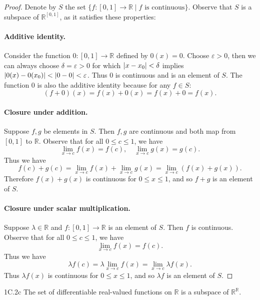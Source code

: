 \documentclass{exam}
\begin{document}
\begin{proof}
    Denote by $S$ the set $\{f: [0, 1]\to\mathbb R\mid f\text{ is continuous}\}$. Observe that $S$ is a subspace of $\mathbb R^{[0, 1]}$, as it satisfies these properties:
    \paragraph{Additive identity.} Consider the function $0:[0, 1]\to\mathbb R$ defined by $0(x) = 0$. Choose $\varepsilon > 0$, then we can always choose $\delta = \varepsilon >  0$ for which $\abs{x-x_0} < \delta$ implies $\abs{0(x) - 0(x_0)} < \abs{0 - 0} < \varepsilon$. Thus $0$ is continuous and is an element of $S$. The function $0$ is also the additive identity because for any $f\in S$: \[
        (f + 0)(x) = f(x) + 0(x) = f(x) + 0 = f(x).
    \]

    \paragraph{Closure under addition.} Suppose $f, g$ be elements in $S$. Then $f, g$ are continuous and both map from $[0, 1]$ to $\mathbb R$. Observe that for all $0\le c\le 1$, we have \[
        \lim_{x\to c}f(x) = f(c),\quad\lim_{x\to c}g(x) = g(c).
    \]
    Thus we have \[
        f(c) + g(c) = \lim_{x\to c}f(x) + \lim_{x\to c}g(x) = \lim_{x\to c}(f(x) + g(x)).
    \]
    Therefore $f(x) + g(x)$ is continuous for $0\le x\le 1$, and so $f + g$ is an element of $S$.

    \paragraph{Closure under scalar multiplication.} Suppose $\lambda\in\mathbb R$ and $f:[0, 1]\to\mathbb R$ is an element of $S$. Then $f$ is continuous. Observe that for all $0\le c\le 1$, we have \[
        \lim_{x\to c} f(x) = f(c).
    \]
    Thus we have \[
        \lambda f(c) = \lambda\lim_{x\to c}f(x) = \lim_{x\to c}\lambda f(x).
    \]
    Thus $\lambda f(x)$ is continuous for $0\le x\le1$, and so $\lambda f$ is an element of $S$.
\end{proof}

\begin{problem}{1C.2c}
    The set of differentiable real-valued functions on $\mathbb R$ is a subspace of $\mathbb R^{\mathbb R}$.
\end{problem}
\end{document}
